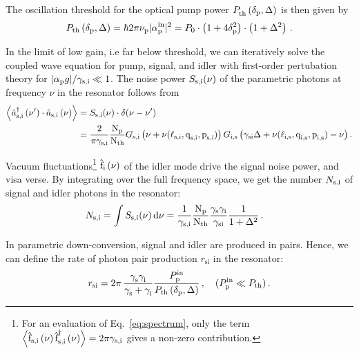 \documentclass[aps,pra,showpacs,reprint,onecolumn,notitlepage]{revtex4-1}
\makeatletter
\newcommand{\avr}[1]{\mathop{\left\langle #1 \right\rangle}\nolimits}
\newcommand{\tx}[1]{\textnormal{#1}}
\def\@fnsymbol#1{\ensuremath{\ifcase#1\or *\or \dagger\or \ddagger\or
   \mathsection\or \mathparagraph\or \|\or **\or \dagger\dagger
   \or \ddagger\ddagger \else\@ctrerr\fi}}
\newcommand{\ssym}[1]{^{\@fnsymbol{#1}}}
\makeatother
\begin{document}
The oscillation threshold for the optical pump power $P^\tx{}_\textrm{th}\left( \delta_\textrm{p},\Delta\right)$ is then given by
\begin{align}
	 P_\textrm{th} \left( \delta_\textrm{p},\Delta\right) = \hslash 2 \pi \nu_\tx{p}  |\alpha^\tx{in}_\tx{p}|^2 = P_\textrm{0} \cdot \left(1 + 4 \delta_\textrm{p}^2 \right) \cdot \left(1 +  \Delta^2\right)   \,.
\label{eq:threshold}
\end{align}

In the limit of low gain, i.e far below threshold, we can iteratively solve the coupled wave equation for pump, signal, and idler with first-order pertubation theory for $|\alpha_\tx{p} g| / \gamma_\tx{s,i} \ll 1$. The noise power $S_\tx{s,i} (\nu)$ of the parametric photons at frequency $\nu$ in the resonator follows from 
\begin{alignat}{3}
	\avr{\hat{a}_\tx{s,i}\ssym{2} \left( \nu^\prime \right)\cdot \hat{a}_\tx{s,i} \left( \nu \right) } &= S_\tx{s,i} (\nu)  \cdot \delta(\nu - \nu^\prime) 
	\notag \\ 
	&=  \frac{2}{\pi \gamma_\tx{s,i}} \frac{ \tx{N}_\tx{p} }{\tx{N}_\tx{th}}  {{G}_\tx{s,i}\left( \nu + \nu (\ell_\textrm{s,i},\textrm{q}_\textrm{s,i},\textrm{p}_\textrm{s,i} ) \right)} \, {{G}_\tx{i,s} \left( \gamma_\tx{si} \Delta + \nu (\ell_\textrm{i,s},\textrm{q}_\textrm{i,s},\textrm{p}_\textrm{i,s} )  - \nu \right)}  \, .
\label{eq:spectrum}
\end{alignat} 

Vacuum fluctuations\footnote{For an evaluation of Eq.~\ref{eq:spectrum}, only the term $\avr{ \hat{\tx{f}}_\tx{s,i} \left( \nu\right) \hat{\tx{f}}_\tx{s,i} \ssym{2} \left( \nu\right) } = 2 \pi \gamma_\tx{s,i}$ gives a non-zero contribution.} $\hat{\tx{f}}_\tx{i} \left( \nu\right)$ of the idler mode drive the signal noise power, and visa verse. By integrating over the full frequency space, we get the number $N_\tx{s,i}$ of signal and idler photons in the resonator: 
\begin{align}
	N_\tx{s,i} &= \int S_\tx{s,i} (\nu) \, \tx{d} \nu = \frac{1}{\gamma_\tx{s,i}} \frac{ \tx{N}_\tx{p} }{\tx{N}_\tx{th}}  \frac{\gamma_\tx{s} \gamma_\tx{i} }{\gamma_\tx{si}} \frac{1}{1 + \Delta^2} \,  .  
	\label{eq:twophotonstate}
\end{align}

In parametric down-conversion, signal and idler are produced in pairs. Hence, we can define the rate of photon pair production ${r_\textrm{si}}{}$ in the resonator:
\begin{align}
	{r_\textrm{si}}{} = 2 \pi \,  \frac{\gamma^{}_\textrm{s} \gamma^{}_\textrm{i}}{\gamma^{}_\textrm{s} + \gamma^{}_\textrm{i}}  \frac{P^\tx{in}_\textrm{p}}{P_\textrm{th}\left( \delta_\textrm{p},\Delta \right)}  \, ,\quad (P^\tx{in}_\textrm{p} \ll P_\textrm{th})  \,.
\label{eq:rategenbelow}
\end{align}
\end{document}
